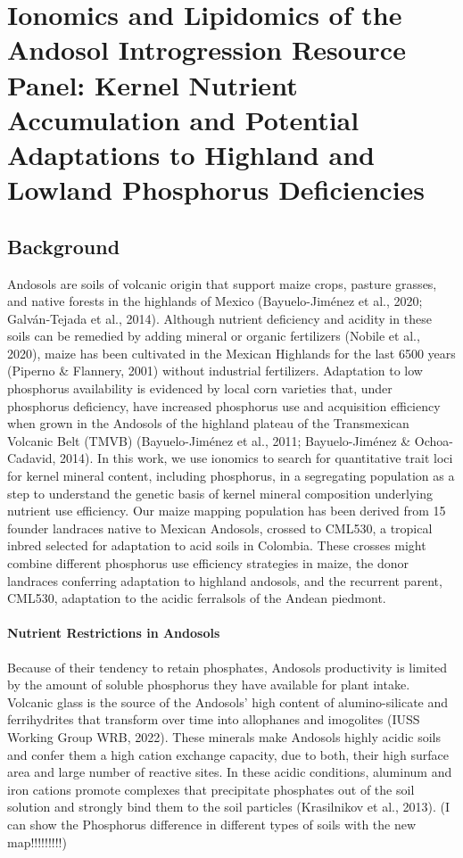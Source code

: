 \chapter{Ionomics and Lipidomics of the Andosol Introgression Resource Panel: Kernel Nutrient Accumulation and Potential Adaptations to Highland and Lowland Phosphorus Deficiencies}
\label{chap-three}

\newrefsection

\section{Background}
Andosols are soils of volcanic origin that support maize crops, pasture grasses, and native forests in the highlands of Mexico (Bayuelo-Jiménez et al., 2020; Galván‐Tejada et al., 2014).
Although nutrient deficiency and acidity in these soils can be remedied by adding mineral or organic fertilizers (Nobile et al., 2020), maize has been cultivated in the Mexican Highlands for the last 6500 years (Piperno \& Flannery, 2001) without industrial fertilizers.
Adaptation to low phosphorus availability is evidenced by local corn varieties that, under phosphorus deficiency, have increased phosphorus use and acquisition efficiency when grown in the Andosols of the highland plateau of the Transmexican Volcanic Belt (TMVB) (Bayuelo-Jiménez et al., 2011; Bayuelo-Jiménez \& Ochoa-Cadavid, 2014).
In this work, we use ionomics to search for quantitative trait loci for kernel mineral content, including phosphorus, in a segregating population as a step to understand the genetic basis of kernel mineral composition underlying nutrient use efficiency.
Our maize mapping population has been derived from 15 founder landraces native to Mexican Andosols, crossed to CML530, a tropical inbred selected for adaptation to acid soils in Colombia.
These crosses might combine different phosphorus use efficiency strategies in maize, the donor landraces conferring adaptation to highland andosols, and the recurrent parent, CML530, adaptation to the acidic ferralsols of the Andean piedmont.

\subsubsection{Nutrient Restrictions in Andosols}

Because of their tendency to retain phosphates, Andosols productivity is limited by the amount of soluble phosphorus they have available for plant intake. Volcanic glass is the source of the Andosols’ high content of alumino-silicate and ferrihydrites that transform over time into allophanes and imogolites (IUSS Working Group WRB, 2022).
These minerals make Andosols highly acidic soils and confer them a high cation exchange capacity, due to both, their high surface area and large number of reactive sites.
In these acidic conditions, aluminum and iron cations promote complexes that precipitate phosphates out of the soil solution and strongly bind them to the soil particles (Krasilnikov et al., 2013).  (I can show the Phosphorus difference in different types of soils  with the new map!!!!!!!!!)

